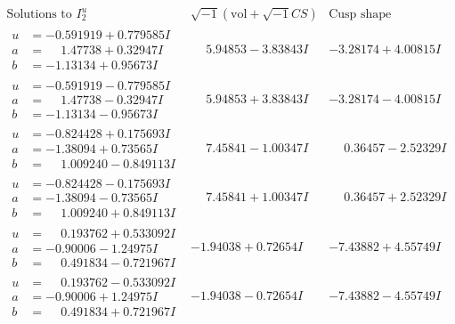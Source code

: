 \documentclass[1p]{elsarticle_modified}
\theoremstyle{definition}
\newcommand{\I}{\sqrt{-1}}
\begin{document}
$$\begin{array}{c|c|c}  
\text{Solutions to }I^u_{2}& \I (\text{vol} + \sqrt{-1}CS) & \text{Cusp shape}\\
 \hline 
\begin{aligned}
u &= -0.591919 + 0.779585 I \\
a &= \phantom{-}1.47738 + 0.32947 I \\
b &= -1.13134 + 0.95673 I\end{aligned}
 & \phantom{-}5.94853 - 3.83843 I & -3.28174 + 4.00815 I \\ \hline\begin{aligned}
u &= -0.591919 - 0.779585 I \\
a &= \phantom{-}1.47738 - 0.32947 I \\
b &= -1.13134 - 0.95673 I\end{aligned}
 & \phantom{-}5.94853 + 3.83843 I & -3.28174 - 4.00815 I \\ \hline\begin{aligned}
u &= -0.824428 + 0.175693 I \\
a &= -1.38094 + 0.73565 I \\
b &= \phantom{-}1.009240 - 0.849113 I\end{aligned}
 & \phantom{-}7.45841 - 1.00347 I & \phantom{-}0.36457 - 2.52329 I \\ \hline\begin{aligned}
u &= -0.824428 - 0.175693 I \\
a &= -1.38094 - 0.73565 I \\
b &= \phantom{-}1.009240 + 0.849113 I\end{aligned}
 & \phantom{-}7.45841 + 1.00347 I & \phantom{-}0.36457 + 2.52329 I \\ \hline\begin{aligned}
u &= \phantom{-}0.193762 + 0.533092 I \\
a &= -0.90006 - 1.24975 I \\
b &= \phantom{-}0.491834 - 0.721967 I\end{aligned}
 & -1.94038 + 0.72654 I & -7.43882 + 4.55749 I \\ \hline\begin{aligned}
u &= \phantom{-}0.193762 - 0.533092 I \\
a &= -0.90006 + 1.24975 I \\
b &= \phantom{-}0.491834 + 0.721967 I\end{aligned}
 & -1.94038 - 0.72654 I & -7.43882 - 4.55749 I \\ \hline\begin{aligned}

\end{aligned}
\end{array}$$
\end{document}
